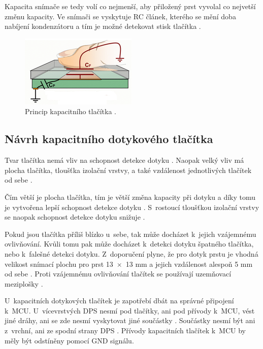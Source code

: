 Kapacita snímače se tedy volí co nejmenší, aby přiložený prst vyvolal co nejvetší změnu kapacity. Ve snímači se vyskytuje
RC článek, kterého se mění doba nabíjení kondenzátoru a tím je možné detekovat stisk tlačítka \cite{PrincipKapTl}. 

\begin{figure}[!h]
  \begin{center}
    \includegraphics[scale=1]{obrazky/kapacitni_princip.png}
  \end{center}
  \caption[Princip kapacitního tlačítka]{Princip kapacitního tlačítka \cite{PrincipKapTl}.}
\end{figure}

\subsection{Návrh kapacitního dotykového tlačítka}
Tvar tlačítka nemá vliv na schopnost detekce dotyku \cite{PrincipKapTl}. Naopak velký vliv má plocha tlačítka, tloušťka
izolační vrstvy, a také vzdálenost jednotlivých tlačítek od sebe \cite{PrincipKapTl}. 

Čím větší je plocha tlačítka, tím je větší změna kapacity při dotyku a díky tomu je vytvořena lepší schopnost detekce 
dotyku \cite{PrincipKapTl}. S~rostoucí tloušťkou izolační vrstvy se naopak schopnost detekce dotyku snižuje \cite{PrincipKapTl}.

Pokud jsou tlačítka příliš blízko u~sebe, tak může docházet k~jejich vzájemnému ovlivňování. Kvůli tomu pak může docházet
k~detekci dotyku špatného tlačítka, nebo k~falešné detekci dotyku. Z~doporučení plyne, že pro dotyk prstu je vhodná velikost snímací 
plochu pro prst 13~$\times$~13 mm a jejich vzdálenost alespoň 5 mm od sebe \cite{PrincipKapTl}. Proti vzájemnému ovlivňování tlačítek
se používají uzemňovací meziplošky \cite{PrincipKapTl}. 

U~kapacitních dotykových tlačítek je zapotřebí dbát na správné připojení k~MCU. U~vícevrstvých DPS nesmí pod tlačítky, ani pod přívody
k~MCU, vést jiné dráhy, ani se zde nesmí vyskytovat jiné součástky \cite{PrincipKapTl}. Součástky nesmí být ani z~vrchní, ani ze spodní 
strany DPS \cite{PrincipKapTl}. Přívody kapacitních tlačítek k~MCU by měly být odstíněny pomocí GND signálu.

